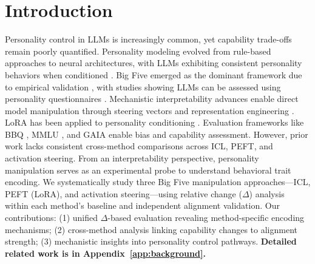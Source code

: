 \section{Introduction}

Personality control in LLMs is increasingly common, yet capability trade-offs remain poorly quantified. Personality modeling evolved from rule-based approaches \citep{mairesse-walker-2007-personage} to neural architectures, with LLMs exhibiting consistent personality behaviors when conditioned \citep{jiang-etal-2023-personallm, huang-etal-2023-chatgpt-personality}. Big Five emerged as the dominant framework due to empirical validation \citep{costa-mccrae-1992-big5}, with studies showing LLMs can be assessed using personality questionnaires \citep{serapio-garcia-etal-2023-personality-traits-llms}. Mechanistic interpretability advances enable direct model manipulation through steering vectors \citep{turner-etal-2023-activation-steering} and representation engineering \citep{li-etal-2023-representation-engineering}. LoRA \citep{hu-etal-2022-lora} has been applied to personality conditioning \citep{zhang-etal-2023-peft-personality}. Evaluation frameworks like BBQ \citep{parrish-etal-2022-bbq}, MMLU \citep{hendrycks-etal-2021-mmlu}, and GAIA \citep{mialon-etal-2023-gaia} enable bias and capability assessment. However, prior work lacks consistent cross-method comparisons across ICL, PEFT, and activation steering. From an interpretability perspective, personality manipulation serves as an experimental probe to understand behavioral trait encoding. We systematically study three Big Five manipulation approaches—ICL, PEFT (LoRA), and activation steering—using relative change (\(\Delta\)) analysis within each method's baseline and independent alignment validation. Our contributions: (1) unified \(\Delta\)-based evaluation revealing method-specific encoding mechanisms; (2) cross-method analysis linking capability changes to alignment strength; (3) mechanistic insights into personality control pathways. \textbf{Detailed related work is in Appendix~\ref{app:background}.}
